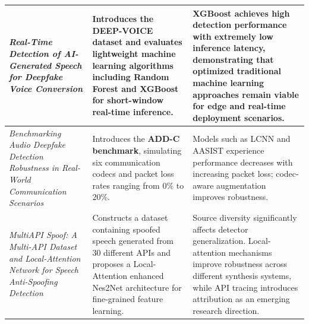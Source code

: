 \begin{longtable}{|
    >{\raggedright\arraybackslash}p{4.3cm} |
    >{\raggedright\arraybackslash}p{4.3cm} |
    >{\raggedright\arraybackslash}p{4.1cm} |}
\\ \hline
\textit{Real-Time Detection of AI-Generated Speech for Deepfake Voice Conversion}
\cite{Bird2023}
&
Introduces the DEEP-VOICE dataset and evaluates lightweight machine learning algorithms including Random Forest and XGBoost for short-window real-time inference.
&
XGBoost achieves high detection performance with extremely low inference latency, demonstrating that optimized traditional machine learning approaches remain viable for edge and real-time deployment scenarios.
\\ \hline
\textit{Benchmarking Audio Deepfake Detection Robustness in Real-World Communication Scenarios}
\cite{Shi2024}
&
Introduces the \textbf{ADD-C benchmark}, simulating six communication codecs and packet loss rates ranging from 0\% to 20\%. 
&
Models such as LCNN and AASIST experience performance decreases with increasing packet loss; codec-aware augmentation improves robustness.
\\ \hline
\textit{MultiAPI Spoof: A Multi-API Dataset and Local-Attention Network for Speech Anti-Spoofing Detection}
\cite{Zhang2025_MultiAPI}
&
Constructs a dataset containing spoofed speech generated from 30 different APIs and proposes a Local-Attention enhanced Nes2Net architecture for fine-grained feature learning.
&
Source diversity significantly affects detector generalization. Local-attention mechanisms improve robustness across different synthesis systems, while API tracing introduces attribution as an emerging research direction.
\\ \hline
\end{longtable}
